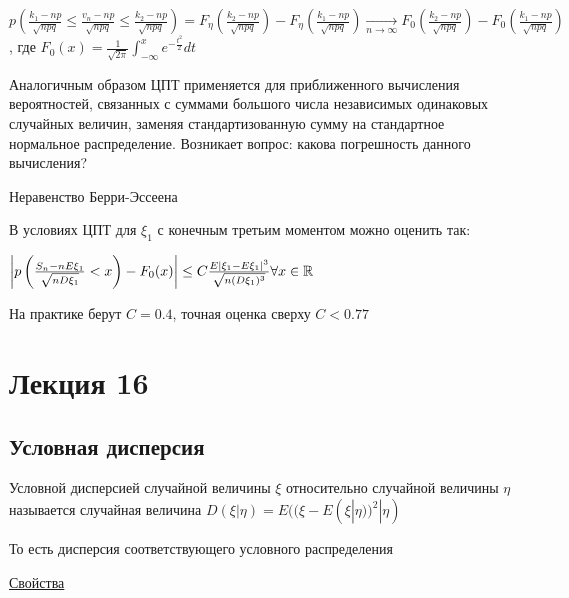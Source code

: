 \documentclass[12pt]{article}
\begin{document}
$p\left(\frac{k_1 - np}{\sqrt{npq}} \leq \frac{v_n - np}{\sqrt{npq}} \leq \frac{k_2 - np}{\sqrt{npq}}\right) = F_\eta\left(\frac{k_2 - np}{\sqrt{npq}}\right) - F_\eta\left(\frac{k_1 - np}{\sqrt{npq}}\right) \underset{n \to \infty}{\longrightarrow} F_0\left(\frac{k_2 - np}{\sqrt{npq}}\right) - F_0\left(\frac{k_1 - np}{\sqrt{npq}}\right)$,
где $F_0(x) = \frac{1}{\sqrt{2\pi}} \int_{-\infty}^x e^{-\frac{t^2}{2}} dt$

\Nota Аналогичным образом ЦПТ применяется для приближенного вычисления вероятностей, связанных с суммами большого числа независимых одинаковых случайных величин, заменяя стандартизованную сумму на стандартное нормальное распределение.
Возникает вопрос: какова погрешность данного вычисления?

\begin{MyTheorem}
    \Ths Неравенство Берри-Эссеена

    В условиях ЦПТ для $\xi_1$ с конечным третьим моментом можно оценить так:

    $\left|p\left(\frac{S_n - nE\xi_1}{\sqrt{nD\xi_1}} < x\right) - F_0(x)\right| \leq C\frac{E|\xi_1 - E\xi_1|^3}{\sqrt{n(D\xi_1)^3}} \forall x \in \mathbb{R}$
\end{MyTheorem}

\Nota На практике берут $C = 0.4$, точная оценка сверху $C < 0.77$







\section{Лекция 16}

\subsection{Условная дисперсия}

\Def Условной дисперсией случайной величины $\xi$ относительно случайной величины $\eta$ называется случайная величина 
$D(\xi | \eta) = E((\xi - E(\xi | \eta))^2 | \eta)$

\Nota То есть дисперсия соответствующего условного распределения

\underline{Свойства}
\end{document}
